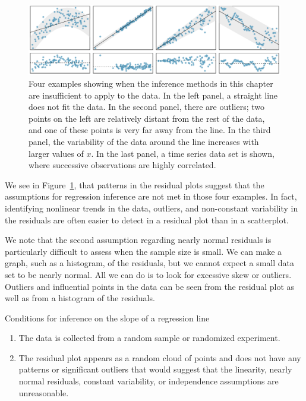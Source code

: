 \begin{figure}
\centering
\includegraphics[width=\textwidth]{ch_regr_simple_linear/figures/whatCanGoWrongWithLinearModel/whatCanGoWrongWithLinearModel}
\caption{Four examples showing when the inference methods in this chapter are insufficient to apply to the data. In the left panel, a straight line does not fit the data. In the second panel, there are outliers; two points on the left are relatively distant from the rest of the data, and one of these points is very far away from the line. In the third panel, the variability of the data around the line increases with larger values of $x$. In the last panel, a time series data set is shown, where successive observations are highly correlated.}
\label{whatCanGoWrongWithLinearModel}
\end{figure}

We see in Figure~\ref{whatCanGoWrongWithLinearModel}, that patterns in the residual plots suggest that the assumptions for regression inference are not met in those four examples.  In fact, identifying nonlinear trends in the data, outliers, and non-constant variability in the residuals are often easier to detect in a residual plot than in a scatterplot.  

We note that the second assumption regarding nearly normal residuals is particularly difficult to assess when the sample size is small.  We can make a graph, such as a histogram, of the residuals, but we cannot expect a small data set to be nearly normal.  All we can do is to look for excessive skew or outliers.  Outliers and influential points in the data can be seen from the residual plot as well as from a histogram of the residuals.

\begin{onebox}{Conditions for inference on the slope of a regression line}
\begin{enumerate}
\item The data is collected from a random sample or randomized experiment.
\item The residual plot appears as a random cloud of points and does not have any patterns or significant outliers that would suggest that the linearity, nearly normal residuals, constant variability, or independence assumptions are unreasonable.  
\end{enumerate}
\end{onebox} 

